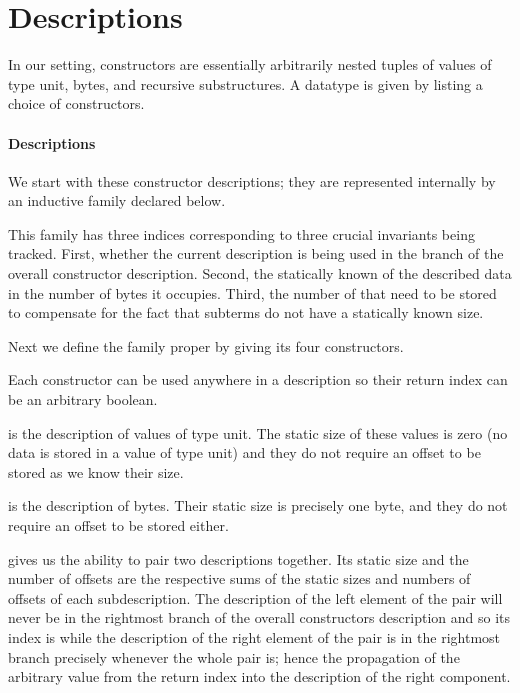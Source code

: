 \section{Descriptions}\label{sec:desc}


In our setting, constructors are essentially arbitrarily nested tuples of
values of type unit,
bytes,
and recursive substructures.
%
A datatype is given by listing a choice of constructors.

\paragraph{Descriptions}
We start with these constructor descriptions;
they are represented internally by an inductive family 
declared below.


This family has three indices corresponding to three crucial
invariants being tracked.
%
First, whether the current description is being used in the
 branch of the overall constructor description.
%
Second, the statically known  of the described data
in the number of bytes it occupies.
%
Third, the number of  that need to be stored to
compensate for the fact that subterms do not have a statically known
size.

Next we define the family proper by giving its four constructors.


Each constructor can be used anywhere in a description so their return
 index can be an arbitrary boolean.

 is the description of values of type unit. The static
size of these values is zero (no data is stored in a value of type unit)
and they do not require an offset to be stored as we know their size.

 is the description of bytes.
%
Their static size is precisely one byte, and they do not require an
offset to be stored either.

 gives us the ability to pair two descriptions together.
Its static size and the number of offsets are the respective sums of the
static sizes and numbers of offsets of each subdescription.
%
The description of the left element of the pair will never be in the
rightmost branch of the overall constructors description and so its
index is  while the description of the right element
of the pair is in the rightmost branch precisely whenever the whole pair
is; hence the propagation of the  arbitrary value from the
return index into the description of the right component.


